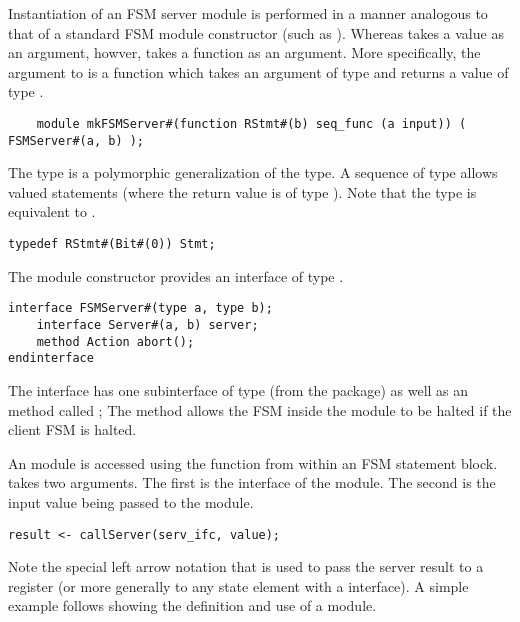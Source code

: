 Instantiation of an FSM server module is performed in a manner
analogous to that of a standard FSM module constructor (such
as ). Whereas  takes a  value as an
argument, howver,  takes a function as an
argument. More specifically, the argument to  is a
function which takes an argument of type  and returns a value
of type .

\begin{verbatim}
    module mkFSMServer#(function RStmt#(b) seq_func (a input)) ( FSMServer#(a, b) );
\end{verbatim}

The  type is a polymorphic generalization of the 
type. A sequence of type  allows valued 
statements (where the return value is of type ). Note that
the  type is equivalent to .

\begin{verbatim}
typedef RStmt#(Bit#(0)) Stmt;
\end{verbatim}

The  module constructor provides an
interface of type .

\begin{verbatim}
interface FSMServer#(type a, type b);
    interface Server#(a, b) server;
    method Action abort();
endinterface
\end{verbatim}

The  interface has one subinterface of
type  (from the  package) as well
as an  method called ; The  method
allows the FSM inside the  module to be halted if the
client FSM is halted.  

An  module is accessed using the 
function from within an FSM statement block.  takes two arguments.  The first is the
interface of the  module. The second is the input value
being passed to the module.

\begin{verbatim}
result <- callServer(serv_ifc, value);
\end{verbatim}

Note the special left arrow notation that is used to pass the server
result to a register (or more generally to any state element with
a  interface). A simple example follows showing the definition
and use of a  module.

